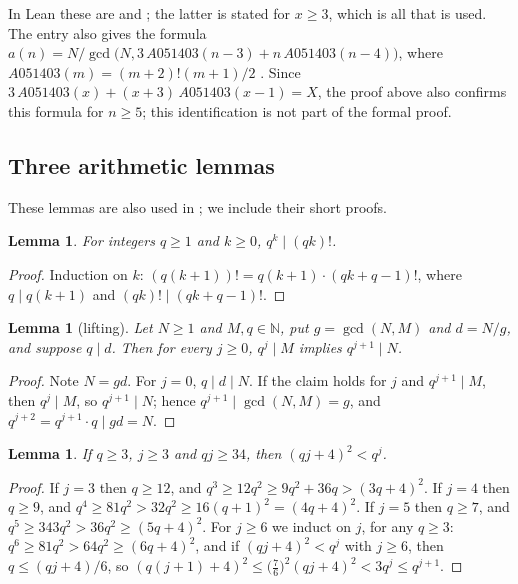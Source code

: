 \documentclass[11pt]{amsart}
\theoremstyle{plain}
\newtheorem{lemma}[theorem]{Lemma}
\theoremstyle{definition}
\newcommand{\N}{\mathbb{N}}
\newcommand{\lf}{\mathop{!}}
\begin{document}
In Lean these are  and ; the latter is stated for $x\ge3$, which is all that is used.
The entry also gives the formula $a(n)=N/\gcd\bigl(N,3\,A051403(n-3)+n\,A051403(n-4)\bigr)$, where $A051403(m)=(m+2)\lf(m+1)/2$ \cite{A051403}. Since $3\,A051403(x)+(x+3)\,A051403(x-1)=X$, the proof above also confirms this formula for $n\ge5$; this identification is not part of the formal proof.

\subsection{Three arithmetic lemmas}
These lemmas are also used in \cite{M0A363482}; we include their short proofs.

\begin{lemma}\label{lem:fact}
For integers $q\ge1$ and $k\ge0$, $q^k\mid(qk)!$.
\end{lemma}

\begin{proof}
Induction on $k$: $(q(k+1))!=q(k+1)\cdot(qk+q-1)!$, where $q\mid q(k+1)$ and $(qk)!\mid(qk+q-1)!$.
\end{proof}

\begin{lemma}[lifting]\label{lem:lift}
Let $N\ge1$ and $M,q\in\N$, put $g=\gcd(N,M)$ and $d=N/g$, and suppose $q\mid d$. Then for every $j\ge0$, $q^j\mid M$ implies $q^{j+1}\mid N$.
\end{lemma}

\begin{proof}
Note $N=gd$. For $j=0$, $q\mid d\mid N$. If the claim holds for $j$ and $q^{j+1}\mid M$, then $q^j\mid M$, so $q^{j+1}\mid N$; hence $q^{j+1}\mid\gcd(N,M)=g$, and $q^{j+2}=q^{j+1}\cdot q\mid gd=N$.
\end{proof}

\begin{lemma}\label{lem:bound}
If $q\ge3$, $j\ge3$ and $qj\ge34$, then $(qj+4)^2<q^j$.
\end{lemma}

\begin{proof}
If $j=3$ then $q\ge12$, and $q^3\ge12q^2\ge9q^2+36q>(3q+4)^2$.
If $j=4$ then $q\ge9$, and $q^4\ge81q^2>32q^2\ge16(q+1)^2=(4q+4)^2$.
If $j=5$ then $q\ge7$, and $q^5\ge343q^2>36q^2\ge(5q+4)^2$.
For $j\ge6$ we induct on $j$, for any $q\ge3$: $q^6\ge81q^2>64q^2\ge(6q+4)^2$, and if $(qj+4)^2<q^j$ with $j\ge6$, then $q\le(qj+4)/6$, so $(q(j+1)+4)^2\le\bigl(\tfrac76\bigr)^2(qj+4)^2<3q^j\le q^{j+1}$.
\end{proof}
\end{document}
